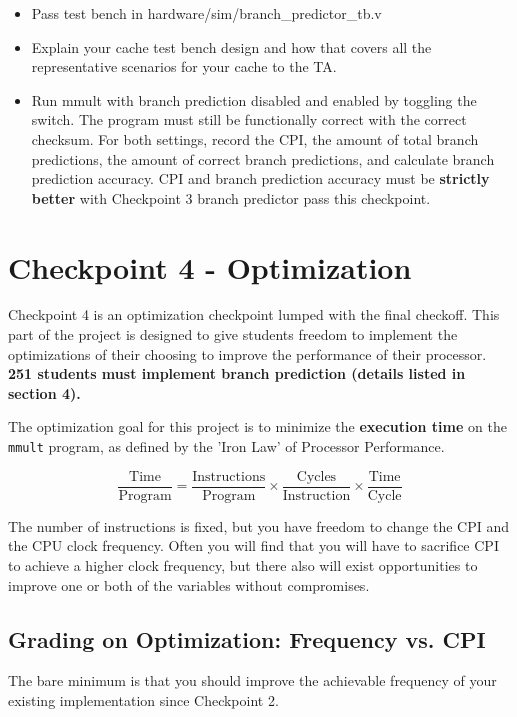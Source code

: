 \documentclass[11pt]{article}
\begin{document}
\begin{itemize}
    \item Pass test bench in hardware/sim/branch\_predictor\_tb.v
    \item Explain your cache test bench design and how that covers all the representative scenarios for your cache to the TA.
    \item Run mmult with branch prediction disabled and enabled by toggling the switch. The program must still be functionally correct with the correct checksum. For both settings, record the CPI, the amount of total branch predictions, the amount of correct branch predictions, and calculate branch prediction accuracy. CPI and branch prediction accuracy must be \textbf{strictly better} with Checkpoint 3 branch predictor pass this checkpoint.
\end{itemize}

\newpage
\section{Checkpoint 4 - Optimization}

Checkpoint 4 is an optimization checkpoint lumped with the final checkoff.
This part of the project is designed to give students freedom to implement the optimizations of their choosing to improve the performance of their processor.
\textbf{251 students must implement branch prediction (details listed in section 4).}

The optimization goal for this project is to minimize the \textbf{execution time} on the \verb|mmult| program, as defined by the 'Iron Law' of Processor Performance.

\begin{equation*}
\frac{\text{Time}}{\text{Program}} = \frac{\text{Instructions}}{\text{Program}} \times \frac{\text{Cycles}}{\text{Instruction}} \times \frac{\text{Time}}{\text{Cycle}}
\end{equation*}

The number of instructions is fixed, but you have freedom to change the CPI and the CPU clock frequency.
Often you will find that you will have to sacrifice CPI to achieve a higher clock frequency, but there also will exist opportunities to improve one or both of the variables without compromises.

\subsection{Grading on Optimization: Frequency vs. CPI}
The bare minimum is that you should improve the achievable frequency of your existing implementation since Checkpoint 2.
\end{document}
